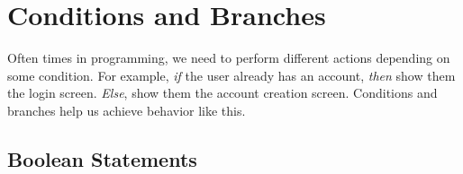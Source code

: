 \documentclass{article}
\begin{document}


\section{Conditions and Branches}

\noindent
Often times in programming, we need to perform different actions depending on some condition. For example, \textit{if} the user already has an account, \textit{then} show them the login screen. \textit{Else}, show them the account creation screen. Conditions and branches help us achieve behavior like this.

\subsection{Boolean Statements}
\end{document}
